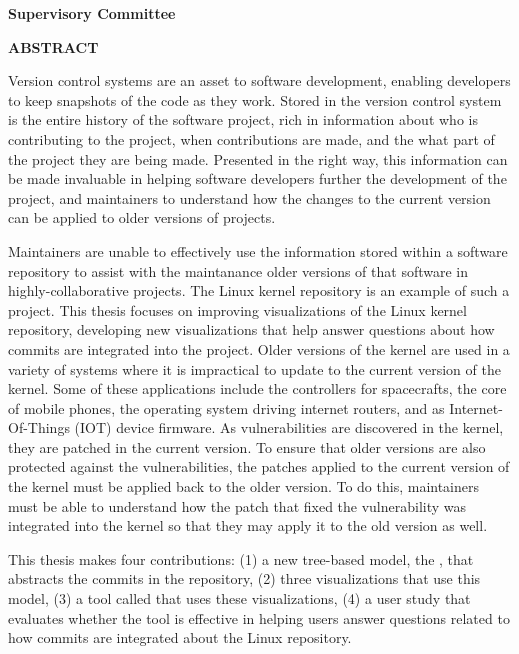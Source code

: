 \newpage
{}

\noindent \textbf{Supervisory Committee}
\tpbreak
\panel

\begin{flushleft}
  \textbf{ABSTRACT}

  Version control systems are an asset to software development, enabling
  developers to keep snapshots of the code as they work.
  Stored in the version control system is the entire history of the
  software project, rich in information about who is contributing to the
  project, when contributions are made, and the what part of the project
  they are being made.
  Presented in the right way, this information can be made invaluable in
  helping software developers further the development of the project,
  and maintainers to understand how the changes to the current version
  can be applied to older versions of projects.

  Maintainers are unable to effectively use the information stored
  within a software repository to assist with the maintanance older
  versions of that software in highly-collaborative projects.
  The Linux kernel repository is an example of such a project.
  This thesis focuses on improving visualizations of the Linux kernel
  repository, developing new visualizations that help answer questions
  about how commits are integrated into the project.
  Older versions of the kernel are used in a variety of systems where it
  is impractical to update to the current version of the kernel.
  Some of these applications include the controllers for spacecrafts,
  the
  core of mobile phones, the operating system driving internet routers,
  and as Internet-Of-Things (IOT) device firmware.
  As vulnerabilities are discovered in the kernel, they are patched in
  the current version.
  To ensure that older versions are also protected against the
  vulnerabilities, the patches applied to the current version of the
  kernel must be applied back to the older version.
  To do this, maintainers must be able to understand how the patch that
  fixed the vulnerability was integrated into the kernel so that they
  may apply it to the old version as well.

  This thesis makes four contributions:
  (1) a new tree-based model, the \mt{}, that abstracts the commits in the repository,
  (2) three visualizations that use this model,
  (3) a tool called \tool{} that uses these visualizations,
  (4) a user study
  that evaluates whether the tool is effective in helping users answer
  questions related to how commits are integrated about the Linux
  repository.



\end{flushleft}
